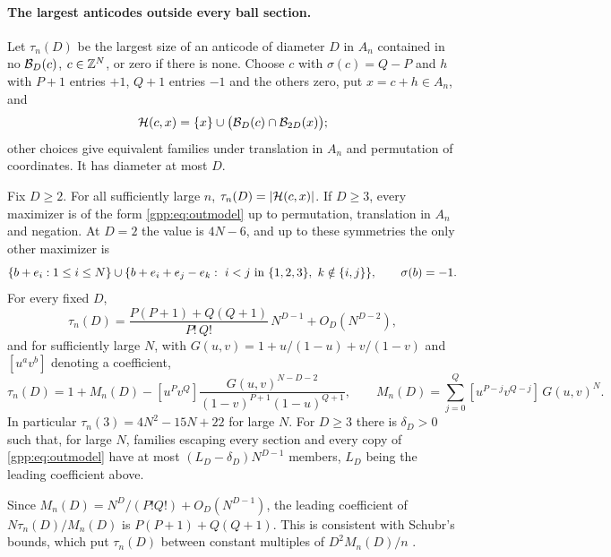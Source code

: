 \paragraph{The largest anticodes outside every ball section.}
Let $\tau_n(D)$ be the largest size of an anticode of diameter $D$ in $A_n$ contained in no
$\mathcal{B}_D(c)$, $c\in\mathbb{Z}^N$, or zero if there is none. Choose $c$ with $\sigma(c)=Q-P$ and $h$
with $P+1$ entries $+1$, $Q+1$ entries $-1$ and the others zero, put $x=c+h\in A_n$, and
\begin{equation}\label{gpp:eq:outmodel}
 \mathcal H(c,x)=\{x\}\cup\bigl(\mathcal{B}_D(c)\cap\mathcal{B}_{2D}(x)\bigr);
\end{equation}
other choices give equivalent families under translation in $A_n$ and permutation of
coordinates. It has diameter at most $D$.

\begin{theorem}\label{gpp:thm:outside}
Fix $D\ge2$. For all sufficiently large $n$, $\tau_n(D)=\lvert\mathcal H(c,x)\rvert$. If $D\ge3$,
every maximizer is of the form \eqref{gpp:eq:outmodel} up to permutation, translation in
$A_n$ and negation. At $D=2$ the value is $4N-6$, and up to these symmetries the only other
maximizer is
\[
 \set{b+e_i:1\le i\le N}\cup\set{b+e_i+e_j-e_k:\ i<j\text{ in }\set{1,2,3},\ k\notin\set{i,j}},
 \qquad\sigma(b)=-1 .
\]
For every fixed $D$,
\[
 \tau_n(D)=\frac{P(P+1)+Q(Q+1)}{P!\,Q!}\,N^{D-1}+O_D(N^{D-2}),
\]
and for sufficiently large $N$, with $G(u,v)=1+u/(1-u)+v/(1-v)$ and $[u^av^b]$ denoting a
coefficient,
\begin{equation}\label{gpp:eq:outexact}
 \tau_n(D)=1+M_n(D)-[u^Pv^Q]\frac{G(u,v)^{N-D-2}}{(1-v)^{P+1}(1-u)^{Q+1}},\qquad
 M_n(D)=\sum_{j=0}^Q[u^{P-j}v^{Q-j}]\,G(u,v)^N .
\end{equation}
In particular $\tau_n(3)=4N^2-15N+22$ for large $N$. For $D\ge3$ there is $\delta_D>0$ such
that, for large $N$, families escaping every section and every copy of
\eqref{gpp:eq:outmodel} have at most $(L_D-\delta_D)N^{D-1}$ members, $L_D$ being the leading
coefficient above.
\end{theorem}

Since $M_n(D)=N^D/(P!Q!)+O_D(N^{D-1})$, the leading coefficient of $N\tau_n(D)/M_n(D)$ is
$P(P+1)+Q(Q+1)$. This is consistent with Schubr's bounds, which put $\tau_n(D)$ between
constant multiples of $D^2M_n(D)/n$ \cite[Theorem~3.3]{Schubr2026Maximum}.

